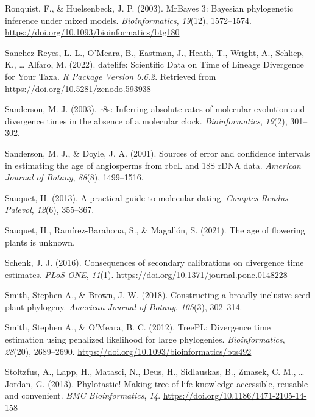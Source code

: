 \documentclass[
  english,
  man]{apa6}
\newlength{\cslhangindent}
\newlength{\cslentryspacingunit} %
\newenvironment{CSLReferences}[2] %
 {%
  \setlength{\parindent}{0pt}
  \ifodd #1
  \let\oldpar\par
  \def\par{\hangindent=\cslhangindent\oldpar}
  \fi
  \setlength{\parskip}{#2\cslentryspacingunit}
 }%
 {}
\begin{document}
\begin{CSLReferences}{1}{0}
\leavevmode{}%
Ronquist, F., \& Huelsenbeck, J. P. (2003). {MrBayes 3: Bayesian phylogenetic inference under mixed models}. \emph{Bioinformatics}, \emph{19}(12), 1572--1574. \url{https://doi.org/10.1093/bioinformatics/btg180}

\leavevmode{}%
Sanchez-Reyes, L. L., O'Meara, B., Eastman, J., Heath, T., Wright, A., Schliep, K., \ldots{} Alfaro, M. (2022). {datelife: Scientific Data on Time of Lineage Divergence for Your Taxa}. \emph{R Package Version 0.6.2}. Retrieved from \url{https://doi.org/10.5281/zenodo.593938}

\leavevmode{}%
Sanderson, M. J. (2003). r8s: Inferring absolute rates of molecular evolution and divergence times in the absence of a molecular clock. \emph{Bioinformatics}, \emph{19}(2), 301--302.

\leavevmode{}%
Sanderson, M. J., \& Doyle, J. A. (2001). Sources of error and confidence intervals in estimating the age of angiosperms from rbcL and 18S rDNA data. \emph{American Journal of Botany}, \emph{88}(8), 1499--1516.

\leavevmode{}%
Sauquet, H. (2013). A practical guide to molecular dating. \emph{{Comptes Rendus Palevol}}, \emph{12}(6), 355--367.

\leavevmode{}%
Sauquet, H., Ramírez-Barahona, S., \& Magallón, S. (2021). The age of flowering plants is unknown.

\leavevmode{}%
Schenk, J. J. (2016). {Consequences of secondary calibrations on divergence time estimates}. \emph{PLoS ONE}, \emph{11}(1). \url{https://doi.org/10.1371/journal.pone.0148228}

\leavevmode{}%
Smith, Stephen A., \& Brown, J. W. (2018). Constructing a broadly inclusive seed plant phylogeny. \emph{American Journal of Botany}, \emph{105}(3), 302--314.

\leavevmode{}%
Smith, Stephen A., \& O'Meara, B. C. (2012). {TreePL: Divergence time estimation using penalized likelihood for large phylogenies}. \emph{Bioinformatics}, \emph{28}(20), 2689--2690. \url{https://doi.org/10.1093/bioinformatics/bts492}

\leavevmode{}%
Stoltzfus, A., Lapp, H., Matasci, N., Deus, H., Sidlauskas, B., Zmasek, C. M., \ldots{} Jordan, G. (2013). {Phylotastic! Making tree-of-life knowledge accessible, reusable and convenient}. \emph{{BMC Bioinformatics}}, \emph{14}. \url{https://doi.org/10.1186/1471-2105-14-158}


\end{CSLReferences}
\end{document}
